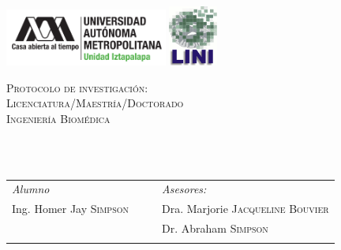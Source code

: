 
\begin{titlepage}

\begin{minipage}{\textwidth}
  \vspace{-3cm}
  \hspace{-2em}
     \includegraphics[width=0.4\textwidth ]{../images/uam-izt-v6}
  \hspace{19em}
     \includegraphics[width=0.12\textwidth]{../images/lini-v1}
\end{minipage}

\begin{center}
	\vspace{0.1cm}

	\begin{minipage}{0.9\textwidth}
		\centering
		\textsc{Protocolo de investigación: \\ Licenciatura/Maestría/Doctorado \\Ingeniería Biomédica}
		\vspace{1em}
   \end{minipage}

   \begin{minipage}{.8\textwidth}
      \centering
		\HRule \\[0.3cm]
		\\
		\HRule
   \end{minipage}
		
	\vspace{1em}
	\begin{tabular}{lp{.2cm}ll}
		\textit{Alumno}
		  & 
		  & 
		  & \textit{Asesores:}\\
		Ing. Homer Jay \textsc{Simpson} 
		  &
		  &
		  & Dra. Marjorie \textsc{Jacqueline Bouvier}\\
		&
		  &
		  & Dr. Abraham \textsc{Simpson}\\[2em]
		&
		&
		& \\
	\end{tabular}



\end{center}
\end{titlepage}
